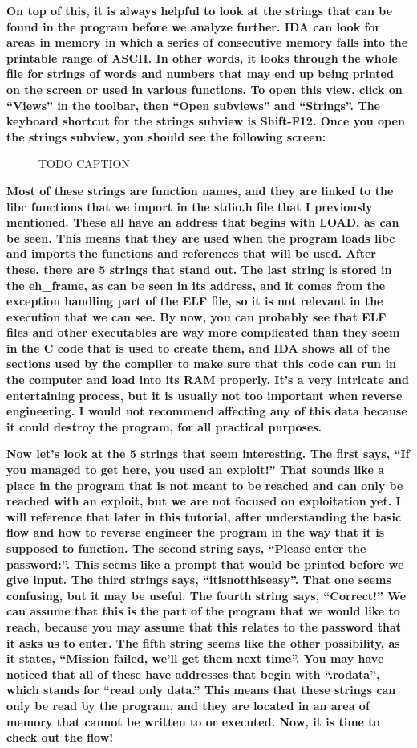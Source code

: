 \documentclass[letterpaper]{article}
\newcommand{\sitfig}[3]{
\begin{figure}[H]
\centering
\makebox[\textwidth][c]{
#2
}
\caption{#3}
\label{#1}
\end{figure}
}
\newcommand{\sitgfx}[4][scale=1.0]{
\sitfig{#3}{\texttt{[image: \#2]}}{#4}
}
\begin{document}
\textbf{On top of this, it is always helpful to look at the strings that can be found in the program before we analyze
further. IDA can look for areas in memory in which a series of consecutive memory falls into the printable range of
ASCII. In other words, it looks through the whole file for strings of words and numbers that may end up being printed
on the screen or used in various functions. To open this view, click on ``Views'' in the toolbar, then ``Open
subviews'' and ``Strings''. The keyboard shortcut for the strings subview is Shift-F12. Once you open the strings
subview, you should see the following screen:}

  
\sitgfx[width=6.1252in,height=3.8335in]{FINALWORKINGDOCFORMERLYPRECURSOR-img046.png}{fig:unk}{TODO CAPTION}
 \textbf{Most of these strings are function names, and they are linked to the libc functions that we import in the
stdio.h file that I previously mentioned. These all have an address that begins with LOAD, as can be seen. This means
that they are used when the program loads libc and imports the functions and references that will be used. After these,
there are 5 strings that stand out. The last string is stored in the eh\_frame, as can be seen in its address, and it
comes from the exception handling part of the ELF file, so it is not relevant in the execution that we can see. By now,
you can probably see that ELF files and other executables are way more complicated than they seem in the C code that is
used to create them, and IDA shows all of the sections used by the compiler to make sure that this code can run in the
computer and load into its RAM properly. It's a very intricate and entertaining process, but it is usually not too
important when reverse engineering. I would not recommend affecting any of this data because it could destroy the
program, for all practical purposes.}

\textbf{Now let's look at the 5 strings that seem interesting. The first says, ``If you managed to get here, you used an
exploit!'' That sounds like a place in the program that is not meant to be reached and can only be reached with an
exploit, but we are not focused on exploitation yet. I will reference that later in this tutorial, after understanding
the basic flow and how to reverse engineer the program in the way that it is supposed to function. The second string
says, ``Please enter the password:''. This seems like a prompt that would be printed before we give input. The third
strings says, ``itisnotthiseasy''. That one seems confusing, but it may be useful. The fourth string says, ``Correct!''
We can assume that this is the part of the program that we would like to reach, because you may assume that this
relates to the password that it asks us to enter. The fifth string seems like the other possibility, as it states,
``Mission failed, we'll get them next time''. You may have noticed that all of these have addresses that begin with
``.rodata'', which stands for ``read only data.'' This means that these strings can only be read by the program, and
they are located in an area of memory that cannot be written to or executed. Now, it is time to check out the flow!}
\end{document}
